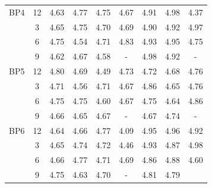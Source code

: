 \begin{table}[h]
{\begin{tabular}{l|c|c|c|c|c|c|c|c}
	\hline
	BP4 & 12 & 4.63 & 4.77 & 4.75 & 4.67 & 4.91 & 4.98 & 4.37 \\ 
	& 3 & 4.65 & 4.75 & 4.70 & 4.69 & 4.90 & 4.92 & 4.97 \\ 
	& 6 & 4.75 & 4.54 & 4.71 & 4.83 & 4.93 & 4.95 & 4.75 \\ 
	& 9 & 4.62 & 4.67 & 4.58 & - & 4.98 & 4.92 & - \\ 
	\hline
	BP5 & 12 & 4.80 & 4.69 & 4.49 & 4.73 & 4.72 & 4.68 & 4.76 \\ 
	& 3 & 4.71 & 4.56 & 4.71 & 4.67 & 4.86 & 4.65 & 4.76 \\ 
	& 6 & 4.75 & 4.75 & 4.60 & 4.67 & 4.75 & 4.64 & 4.86 \\ 
	& 9 & 4.66 & 4.65 & 4.67 & - & 4.67 & 4.74 & - \\ 
	\hline
	BP6 & 12 & 4.64 & 4.66 & 4.77 & 4.09 & 4.95 & 4.96 & 4.92 \\ 
	& 3 & 4.65 & 4.74 & 4.72 & 4.46 & 4.93 & 4.87 & 4.98 \\ 
	& 6 & 4.66 & 4.77 & 4.71 & 4.69 & 4.86 & 4.88 & 4.60 \\ 
	& 9 & 4.75 & 4.63 & 4.70 & - & 4.81 & 4.79 &  \\ 
	\hline
\end{tabular}

	}
\end{table}



